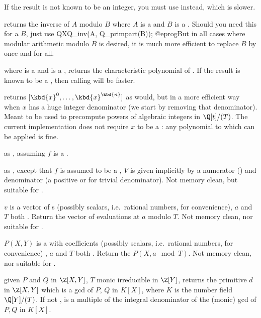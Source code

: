If the result is not known to be an integer, you must use 
instead, which is slower.

 returns the inverse of $A$ modulo $B$
where $A$ is a  and $B$ is a . Should you need this for
a  $B$, just use
\bprog
  QXQ_inv(A, Q_primpart(B));
@eprog\noindent But in all cases where modular arithmetic modulo $B$ is
desired, it is much more efficient to replace $B$ by 
once and for all.

 where  is a  and
 is a , returns the characteristic polynomial of .
If the result is known to be a , then calling  will
be faster.

 returns $[\kbd{x}^0, \dots,
\kbd{x}^\kbd{n}]$ as  would, but in a more efficient way when
$x$ has a huge integer denominator (we start by removing that denominator).
Meant to be used to precompute powers of algebraic integers in $\Q[t]/(T)$.
The current implementation does not require $x$ to be a : any
polynomial to which  can be applied is fine.

 as , assuming $f$
is a .

 as ,
except that $f$ is assumed to be a , $V$ is given implicitly
by a numerator  () and denominator  (a positive
 or  for trivial denominator). Not memory clean, but
suitable for .

 $v$ is a vector of s
(possibly scalars, i.e.~rational numbers, for convenience), $a$ and $T$ both
. Return the vector of evaluations at $a$ modulo $T$.
Not memory clean, nor suitable for .

 $P(X,Y)$ is a  with
 coefficients (possibly scalars, i.e.~rational numbers, for
convenience) , $a$ and $T$ both . Return the  $P(X, a \mod
T)$. Not memory clean, nor suitable for .

 given $P$ and $Q$ in
$\Z[X,Y]$, $T$ monic irreducible in $\Z[Y]$, returns the primitive $d$ in
$\Z[X,Y]$ which is a gcd of $P$, $Q$ in $K[X]$, where $K$ is the number field
$\Q[Y]/(T)$. If not ,  is a multiple of the integral
denominator of the (monic) gcd of $P,Q$ in $K[X]$.

